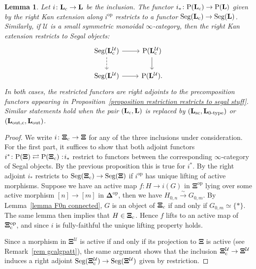 \documentclass{amsart}
\numberwithin{theorem}{subsection}
\newtheorem{lemma}[theorem]{Lemma}
\theoremstyle{definition}
\providecommand{\op}{\mathrm{op}}
\newcommand{\xU}{\mathcal{U}}
\newcommand{\Pre}{\name{P}}
\newcommand*\cocolon{%
	\nobreak
	\mskip6mu plus1mu
	\mathpunct{}%
	\nonscript
	\mkern-\thinmuskip
	{:}%
	\mskip2mu
	\relax
}
\newcommand{\isoto}{\xrightarrow{\sim}}
\newcommand{\name}[1]{\ensuremath{\text{\textup{#1}}}}
\newcommand{\simp}{\mathbf{\Delta}}
\newcommand{\levelg}{\mathbf{L}}
\newcommand{\levelU}{\levelg^\xU}
\newcommand{\levelgconn}{\levelg_{\name{c}}}
\newcommand{\levelcU}{\levelgconn^{\xU}}
\newcommand{\gc}{\mathbf{\Xi}}
\newcommand{\gcU}{\gc^{\xU}}
\newcommand{\Seg}{\name{Seg}}
\begin{document}
\begin{lemma}\label{lem actlift}
Let $i \colon \levelgconn \to \levelg$ be the inclusion.
The functor $i_*\colon \Pre(\levelgconn)\to \Pre(\levelg)$ given by the right Kan extension along $i^\op$ restricts to a functor $\Seg(\levelgconn)\to \Seg(\levelg)$.
Similarly, if $\xU$ is a small symmetric monoidal $\infty$-category, then the right Kan extension restricts to Segal objects:
\[ \begin{tikzcd}
\Seg(\levelcU) \rar \dar[dashed] & \Pre(\levelcU) \dar
\\
\Seg(\levelU) \rar & \Pre(\levelU).
\end{tikzcd} \]
In both cases, the restricted functors are right adjoints to the precomposition functors appearing in Proposition~\ref{proposition restriction restricts to segal stuff}.
Similar statements hold when the pair $(\levelgconn, \levelg)$ is replaced by $(\levelg_{\name{sc}},\levelg_{\name{0-type}})$ or $(\levelg_{\name{out,c}},\levelg_{\name{out}})$.
\end{lemma}
\begin{proof}
We write $i\colon \gc_{\name{c}}\to \gc$ for any of the three inclusions under consideration.
For the first part, it suffices to show that both adjoint functors $i^*\colon \Pre(\gc)\rightleftarrows  \Pre(\gc_{\name{c}})\cocolon i_*$ restrict to functors between the corresponding $\infty$-category of Segal objects. 
By the previous proposition this is true for $i^*$. 
By \cite[Proposition 6.3]{patterns1} the right adjoint $i_*$ restricts to $\Seg(\gc_{\name{c}})\to \Seg(\gc)$ if $i^\op$ has unique lifting of active morphisms. 
Suppose we have an active map $f\colon H\to i(G)$ in $\gc^\op$ lying over some active morphism $[n]\to [m]$ in $\simp^\op$, then we have $H_{0,n}\isoto G_{0,m}$. 
By Lemma~\ref{lemma F0n connected}, $G$ is an object of $\gc_{\name{c}}$ if and only if $G_{0,m}\simeq\{*\}$. 
The same lemma then implies that $H\in \gc_{\name{c}}$.
Hence $f$ lifts to an active map of $\gc_{\name{c}}^\op$, and since $i$ is fully-faithful the unique lifting property holds.

Since a morphism in $\gcU$ is active if and only if its projection to $\gc$ is active (see Remark~\ref{rem gcalgpatt}), the same argument shows that the inclusion $\gc_{\name{c}}^\xU\to \gc^\xU$ induces a right adjoint $\Seg(\gc_\name{c}^\xU)\to \Seg(\gc^\xU)$ given by restriction.
\end{proof}
\end{document}
